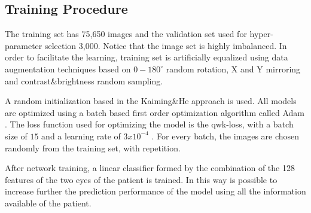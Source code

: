 \documentclass[preprint]{elsarticle}
\theoremstyle{definition} %
\theoremstyle{remark}
\begin{document}
\subsection{Training Procedure}

The training set has 75,650 images and the validation set used for hyper-parameter selection 3,000. Notice that the image set is highly imbalanced. In order to facilitate the learning, training set is artificially equalized using data augmentation techniques \cite{Krizhevsky:2012} based on $0-180^{\circ}$ random rotation, X and Y mirroring and contrast\&brightness random sampling.

A random initialization based in the Kaiming\&He approach \cite{kaiming} is used. All models are optimized using a batch based first order optimization algorithm called Adam \cite{DBLP:journals/corr/KingmaB14}. The loss function used for optimizing the model is the qwk-loss, with a batch size of $15$ and a learning rate of $3x10^{-4}$ \cite{DELATORRE2017}. For every batch, the images are chosen randomly from the training set, with repetition. 

After network training, a linear classifier formed by the combination of the 128 features of the two eyes of the patient is trained. In this way is possible to increase further the prediction performance of the model using all the information available of the patient.
\end{document}
